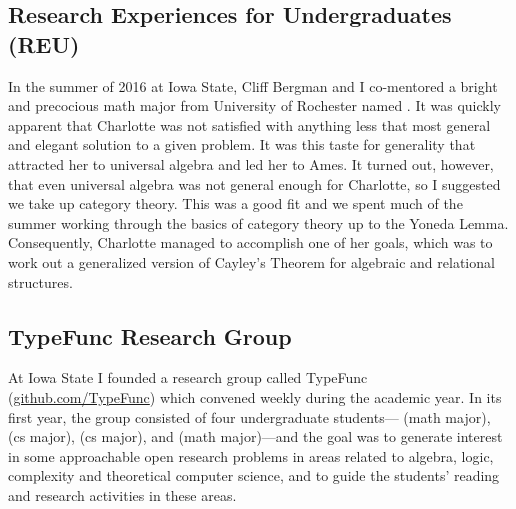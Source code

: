 \subsection{Research Experiences for Undergraduates (REU)}
In the summer of 2016 at Iowa State, Cliff Bergman and I co-mentored a bright and precocious math major from University of Rochester named .  It was quickly apparent that Charlotte was not satisfied with anything less that most general and elegant solution to a given problem. It was this taste for generality that attracted her to universal algebra and led her to Ames. It turned out, however, that even universal algebra was not general enough for Charlotte, so I suggested we take up category theory.  This was a good fit and we spent much of the summer working through the basics of category theory up to the Yoneda Lemma. Consequently, Charlotte managed to accomplish one of her goals, which was to work out a generalized version of Cayley's Theorem for algebraic and relational structures.  

\subsection{TypeFunc Research Group}
\label{sec:typef-rese-group}
At Iowa State I founded a research group called TypeFunc (\href{https://github.com/TypeFunc/}{github.com/TypeFunc}) which convened weekly during the academic year.  In its first year, the group consisted of four undergraduate students--- (math major),  (cs major),  (cs major), and  (math major)---and the goal was to generate interest in some approachable open research problems in areas related to algebra, logic, complexity and theoretical computer science, and to guide the students' reading and research activities in these areas.


